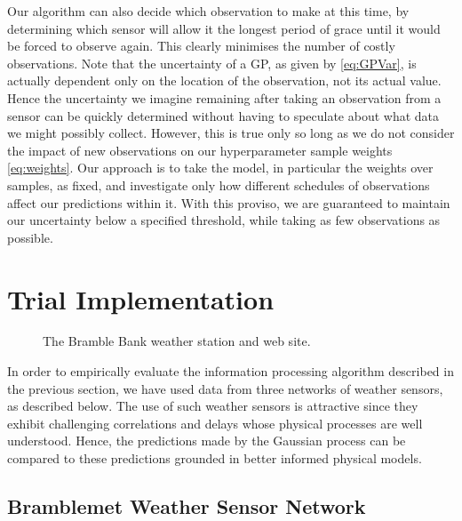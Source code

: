 \documentclass{acmtrans2m}
\begin{document}
Our algorithm can also decide which observation to make at this time, by determining which sensor will allow it the longest period of grace until it would be forced to observe again. This clearly minimises the number of costly observations. Note that the uncertainty of a GP, as given by \eqref{eq:GPVar}, is actually dependent only on the location of the observation, not its actual value. Hence the uncertainty we imagine remaining after taking an observation from a sensor can be quickly determined without having to speculate about what data we might possibly collect. However, this is true only so long as we do not consider the impact of new observations on our hyperparameter sample weights \eqref{eq:weights}. Our approach is to take the model, in particular the weights over samples, as fixed, and investigate only how different schedules of observations affect our predictions within it. With this proviso, we are guaranteed to maintain our uncertainty below a specified threshold, while taking as few observations as possible.

\section{Trial Implementation}\label{sec_implementation}

\begin{figure}
\begin{center}
 \hspace{0.25cm}
\caption{The Bramble Bank weather station and web site.}
\label{bramble_sensor}
\end{center}
\end{figure}

\noindent In order to empirically evaluate the information processing algorithm described in the previous section, we have used data from three networks of weather sensors, as described below. The use of such weather sensors is attractive since they exhibit challenging correlations and delays whose physical processes are well understood. Hence, the predictions made by the Gaussian process can be compared to these predictions grounded in better informed physical models.

\subsection{Bramblemet Weather Sensor Network}
\end{document}
